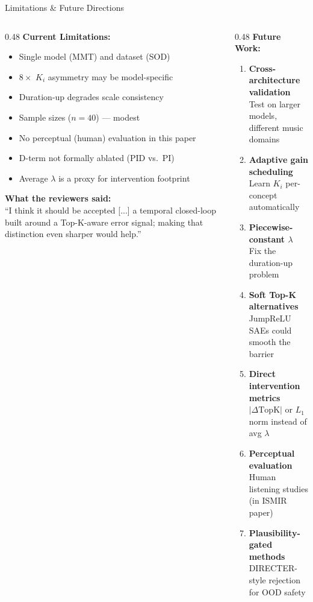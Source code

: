 \documentclass[aspectratio=169, 11pt]{beamer}
\begin{document}
\begin{frame}{Limitations \& Future Directions}

\begin{columns}[T]
\begin{column}{0.48\textwidth}
\textbf{Current Limitations:}
\begin{itemize}
  \item Single model (MMT) and dataset (SOD)
  \item $8\times$ $K_i$ asymmetry may be model-specific
  \item Duration-up degrades scale consistency
  \item Sample sizes ($n{=}40$) --- modest
  \item No perceptual (human) evaluation in this paper
  \item D-term not formally ablated (PID vs.\ PI)
  \item Average $\lambda$ is a proxy for intervention footprint
\end{itemize}

\vspace{0.5em}
\textbf{What the reviewers said:}\\
{\small ``I think it should be accepted [...] a temporal closed-loop built around a Top-K-aware error signal; making that distinction even sharper would help.''}
\end{column}

\begin{column}{0.48\textwidth}
\textbf{Future Work:}
\begin{enumerate}
  \item \textbf{Cross-architecture validation}\\
    {\small Test on larger models, different music domains}
  \item \textbf{Adaptive gain scheduling}\\
    {\small Learn $K_i$ per-concept automatically}
  \item \textbf{Piecewise-constant $\lambda$}\\
    {\small Fix the duration-up problem}
  \item \textbf{Soft Top-K alternatives}\\
    {\small JumpReLU SAEs could smooth the barrier}
  \item \textbf{Direct intervention metrics}\\
    {\small $|\Delta\text{TopK}|$ or $L_1$ norm instead of avg $\lambda$}
  \item \textbf{Perceptual evaluation}\\
    {\small Human listening studies (in ISMIR paper)}
  \item \textbf{Plausibility-gated methods}\\
    {\small DIRECTER-style rejection for OOD safety}
\end{enumerate}
\end{column}
\end{columns}


\end{frame}
\end{document}
